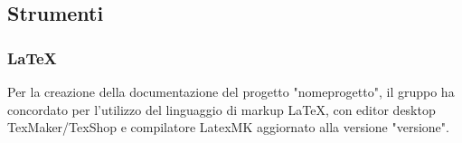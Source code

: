 \subsection{Strumenti}
\subsubsection{\LaTeX{}}
Per la creazione della documentazione del progetto "nomeprogetto", il gruppo {\Gruppo} ha concordato per l’utilizzo del linguaggio di markup \LaTeX{}, con editor desktop TexMaker/TexShop e compilatore LatexMK aggiornato alla versione "versione".

